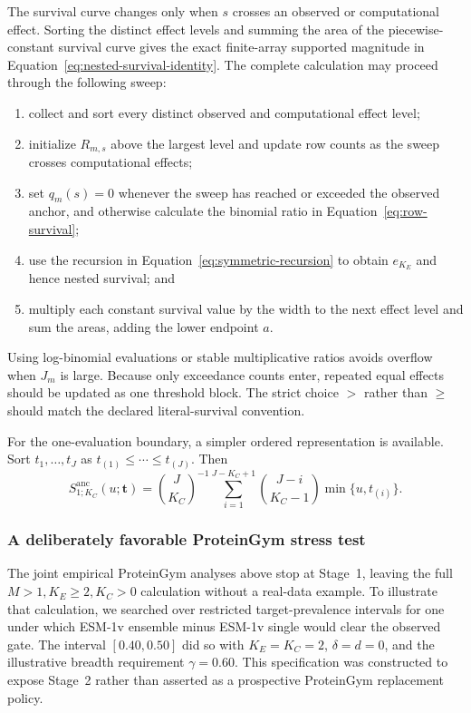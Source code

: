 \documentclass[11pt]{article}
\newcommand{\Sanc}{S^{\mathrm{anc}}}
\theoremstyle{remark}
\begin{document}
The survival curve changes only when $s$ crosses an observed or computational
effect. Sorting the distinct effect levels and summing the area of the
piecewise-constant survival curve gives the exact finite-array supported
magnitude in Equation~\eqref{eq:nested-survival-identity}. The complete
calculation may proceed through the following sweep:
\begin{enumerate}
\item collect and sort every distinct observed and computational effect level;
\item initialize $R_{m,s}$ above the largest level and update row counts as the
sweep crosses computational effects;
\item set $q_m(s)=0$ whenever the sweep has reached or exceeded the observed
anchor, and otherwise calculate the binomial ratio in
Equation~\eqref{eq:row-survival};
\item use the recursion in Equation~\eqref{eq:symmetric-recursion} to obtain
$e_{K_E}$ and hence nested survival; and
\item multiply each constant survival value by the width to the next effect
level and sum the areas, adding the lower endpoint $a$.
\end{enumerate}
Using log-binomial evaluations or stable multiplicative ratios avoids overflow
when $J_m$ is large. Because only exceedance counts enter, repeated equal
effects should be updated as one threshold block. The strict choice $>$ rather
than $\geq$ should match the declared literal-survival convention.

For the one-evaluation boundary, a simpler ordered representation is available.
Sort $t_1,\ldots,t_J$ as $t_{(1)}\leq\cdots\leq t_{(J)}$. Then
\begin{equation}
\Sanc_{1;K_C}(u;\mathbf t)
=
\binom{J}{K_C}^{-1}
\sum_{i=1}^{J-K_C+1}
\binom{J-i}{K_C-1}
\min\{u,t_{(i)}\}.
\label{eq:one-row-sorted}
\end{equation}

\subsubsection{A deliberately favorable ProteinGym stress test}
\label{app:proteingym-nested}

The joint empirical ProteinGym analyses above stop at Stage~1, leaving the full
$M>1,K_E\geq2,K_C>0$ calculation without a real-data example. To illustrate
that calculation, we searched over restricted target-prevalence intervals for
one under which ESM-1v ensemble minus ESM-1v single would clear the observed
gate. The interval $[0.40,0.50]$ did so with $K_E=K_C=2$, $\delta=d=0$, and
the illustrative breadth requirement $\gamma=0.60$. This specification was
constructed to expose Stage~2 rather than asserted as a prospective
ProteinGym replacement policy.
\end{document}
